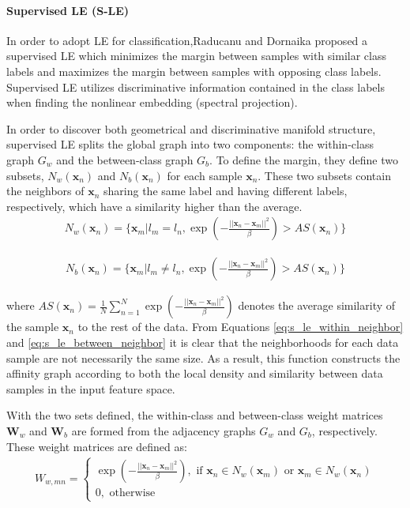 \paragraph{Supervised LE (S-LE)}
In order to adopt LE for classification,Raducanu and Dornaika \citep{Raducanu2012SupervisedNonlinearDimReduction} proposed a supervised LE which minimizes the margin between samples with similar class labels and maximizes the margin between samples with opposing class labels.  Supervised LE utilizes discriminative information contained in the class labels when finding the nonlinear embedding (spectral projection). 

In order to discover both geometrical and discriminative manifold structure, supervised LE splits the global graph into two components: the within-class graph $G_{w}$ and the between-class graph $G_{b}$.  To define the margin, they define two subsets, $N_{w}(\bm{x}_{n})$ and $N_{b}(\bm{x}_{n})$ for each sample $\bm{x}_{n}$.  These two subsets contain the neighbors of $\bm{x}_{n}$ sharing the same label and having different labels, respectively, which have a similarity higher than the average.
\begin{align}
	N_{w}(\bm{x}_n) = \{\bm{x}_m |l_{m} = l_{n}, \exp \left (- \frac{||\bm{x}_{n} - \bm{x}_{m} ||^{2}}{\beta} \right)  > AS(\bm{x}_{n}) \} \label{eq:s_le_within_neighbor}
\end{align}

\begin{align}
N_{b}(\bm{x}_n) = \{\bm{x}_m |l_{m} \neq l_{n}, \exp \left (- \frac{||\bm{x}_{n} - \bm{x}_{m} ||^{2}}{\beta} \right)  > AS(\bm{x}_{n}) \} \label{eq:s_le_between_neighbor}
\end{align}

\noindent
where $AS(\bm{x}_{n}) = \frac{1}{N} \sum_{n=1}^{N} \exp \left (- \frac{||\bm{x}_{n} - \bm{x}_{m} ||^{2}}{\beta} \right)$ denotes the average similarity of the sample  $\bm{x}_{n}$ to the rest of the data.  From Equations \ref{eq:s_le_within_neighbor} and \ref{eq:s_le_between_neighbor} it is clear that the neighborhoods for each data sample are not necessarily the same size.  As a result, this function constructs the affinity graph according to both the local density and similarity between data samples in the input feature space.

With the two sets defined, the within-class and between-class weight matrices $\bm{W}_{w}$ and $\bm{W}_{b}$ are formed from the adjacency graphs $G_{w}$ and $G_{b}$, respectively.  These weight matrices are defined as:
\begin{align}
	W_{w,mn} =
	\begin{cases}
		\exp \left (- \frac{||\bm{x}_{n} - \bm{x}_{m} ||^{2}}{\beta} \right), \text{ if } \bm{x}_{n} \in N_{w}(\bm{x}_{m}) \text{ or } \bm{x}_{m} \in N_{w}(\bm{x}_{n})  \\
		0, \text{ otherwise}
	\end{cases}
\end{align}

